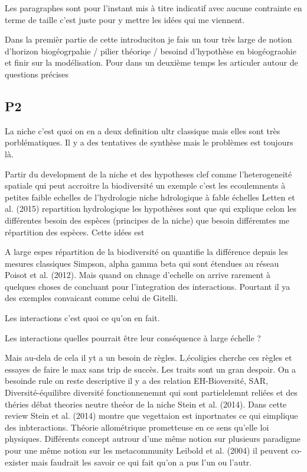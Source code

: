 Les paragraphes sont pour l'instant mis à titre indicatif avec aucune
contrainte en terme de taille c'est juste pour y mettre les idées qui me
viennent.

Dans la premièr partie de cette introduciton je fais un tour très large
de notion d'horizon biogéogrpahie / pilier théoriqe / besoind
d'hypothèse en biogéograohie et finir sur la modélisation. Pour dans un
deuxième temps les articuler autour de questions précises

\subsection{P2}\label{p2}

La niche c'est quoi on en a deux definition ultr classique mais elles
sont très porblématiques. Il y a des tentatives de synthèse mais le
problèmes est toujours là.

Partir du development de la niche et des hypotheses clef comme
l'heterogeneité spatiale qui peut accroitre la biodiversité un exemple
c'est les ecoulemnents à petites faible echelles de l'hydrologie niche
hdrologique à fable échelles Letten et al. (2015) repartition
hydrologique les hypothèses sont que qui explique celon les différentes
besoin des espèces (principes de la niche) que besoin différemtes me
répartition des espèces. Cette idées est

A large espes répartition de la biodiversité on quantifie la différence
depuis les mesures classiques Simpson, alpha gamma beta qui sont
étendues au réseau Poisot et al. (2012). Mais quand on chnage d'echelle
on arrive rarement à quelques choses de concluant pour l'integration des
interactions. Pourtant il ya des exemples convaicant comme celui de
Gitelli.

Les interactions c'est quoi ce qu'on en fait.

Les interactions quelles pourrait être leur conséquence à large échelle
?

Mais au-dela de cela il yt a un besoin de règles. L,écoligies cherche
ces règles et essayes de faire le max sans trip de succès. Les traits
sont un gran despoir. On a besoinde rule on reste descriptive il y a des
relation EH-Bioversité, SAR, Diversité-équilibre diversité
fonctionnenemnt qui sont partielelemnt reliées et des théries débat
theories neutre theéor de la niche Stein et al. (2014). Dans cette
review Stein et al. (2014) montre que vegettaion est inportnates ce qui
eimplique des inbteractions. Théorie allométrique prometteuse en ce sens
qu'elle loi physiques. Différents concept autrour d'une même notion sur
plusieurs paradigme pour une même notion sur les metacommunity Leibold
et al. (2004) il peuvent co-exister mais faudrait les savoir ce qui fait
qu'on a pus l'un ou l'autr.

